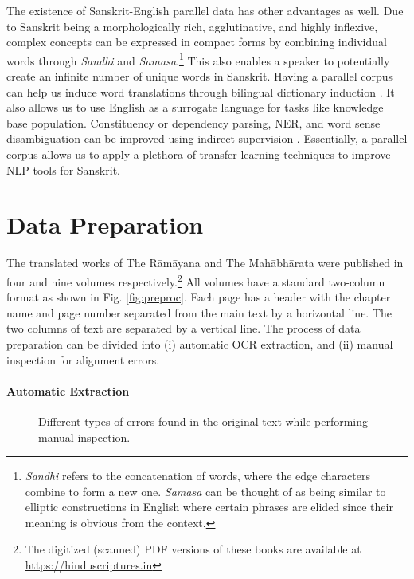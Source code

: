 \documentclass[11pt,a4paper]{article}
\newcommand\ramayana{The R\={a}m\={a}yana\xspace}
\newcommand\mahabharata{The Mah\={a}bh\={a}rata\xspace}
\begin{document}
The existence of Sanskrit-English parallel data has other advantages as well. Due to Sanskrit being a morphologically rich, agglutinative, and highly inflexive, complex concepts can be expressed in compact forms by combining individual words through {\it Sandhi} and {\it Samasa}.\footnote{{\it Sandhi} refers to the concatenation of words, where the edge characters combine to form a new one. {\it Samasa} can be thought of as being similar to elliptic constructions in English where certain phrases are elided since their meaning is obvious from the context.} This also enables a speaker to potentially create an infinite number of unique words in Sanskrit. Having a parallel corpus can help us induce word translations through bilingual dictionary induction \cite{bdi}. It also allows us to use English as a surrogate language for tasks like knowledge base population. Constituency or dependency parsing, NER, and word sense disambiguation can be improved using indirect supervision \cite{indirect-supervision}. Essentially, a parallel corpus allows us to apply a plethora of transfer learning techniques to improve NLP tools for Sanskrit.

\section{Data Preparation}

The translated works of \ramayana and \mahabharata were published in four and nine volumes respectively.\footnote{The digitized (scanned) PDF versions of these books are available at \url{https://hinduscriptures.in}} All volumes have a standard two-column format as shown in Fig. \ref{fig:preproc}. Each page has a header with the chapter name and page number separated from the main text by a horizontal line. The two columns of text are separated by a vertical line. The process of data preparation can be divided into (i) automatic OCR extraction, and (ii) manual inspection for alignment errors.

\paragraph{Automatic Extraction}

\begin{figure*}[htb!]
\centering
{}\hfill
{}\hfill
{}\hfill
\caption{Different types of errors found in the original text while performing manual inspection.} \label{fig:errors}
\end{figure*}
\end{document}
